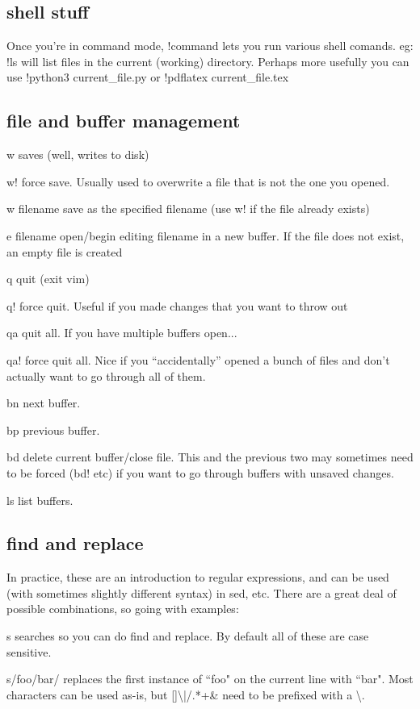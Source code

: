 \documentclass[12pt]{article}
\begin{document}
\subsection{shell stuff}
Once you're in command mode, !command lets you run various shell comands. eg: !ls will list files in the current (working) directory. Perhaps more usefully you can use !python3 current\_file.py or !pdflatex current\_file.tex

\subsection{file and buffer management}
w saves (well, writes to disk)

w! force save. Usually used to overwrite a file that is not the one you opened.

w filename save as the specified filename (use w! if the file already exists)

e filename open/begin editing filename in a new buffer. If the file does not exist, an empty file is created

q quit (exit vim)

q! force quit. Useful if you made changes that you want to throw out

qa quit all. If you have multiple buffers open...

qa! force quit all. Nice if you ``accidentally'' opened a bunch of files and don't actually want to go through all of them.

bn next buffer.

bp previous buffer.

bd delete current buffer/close file. This and the previous two may sometimes need to be forced (bd! etc) if you want to go through buffers with unsaved changes.

ls list buffers.

\subsection{find and replace}
In practice, these are an introduction to regular expressions, and can be used (with sometimes slightly different syntax) in sed, etc. There are a great deal of possible combinations, so going with examples:

s searches so you can do find and replace. By default all of these are case sensitive.

s/foo/bar/ replaces the first instance of ``foo" on the current line with ``bar". Most characters can be used as-is, but []{}\textbackslash |/.*+\& need to be prefixed with a \textbackslash.
\end{document}
